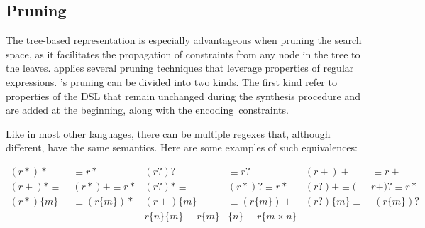 \subsection{Pruning}\label{sec:pruning}
The tree-based representation is especially advantageous when pruning the search space, as it facilitates the propagation of constraints from any node in the tree to the leaves.
\Forest{} applies several pruning techniques that leverage properties of regular expressions. \Forest{}'s pruning can be divided into two kinds. The first kind refer to properties of the DSL that remain unchanged during the synthesis procedure and are added at the beginning, along with the encoding~constraints. %

Like in most other languages, there can be multiple regexes that, although different, have the same semantics. Here are some examples of such equivalences:
%

%
\begin{align*}
 (r*)* &\equiv r*               &  (r?)? &\equiv r?             &  (r+)+ &\equiv r+ \\
 (r+)* \equiv\;&(r*)+ \equiv r*       &  (r?)* \equiv\;&(r*)? \equiv r*     &  (r?)+ \equiv(&r+)? \equiv r* \\
 (r*)\{m\} &\equiv (r\{m\})*    & (r+)\{m\} &\equiv (r\{m\})+   & (r?)\{m\} \equiv&\; (r\{m\})? \\
                  &&r\{n\}\{m\} \equiv r\{m\}&\{n\} \equiv r\{m\times n\}&&
\end{align*}

